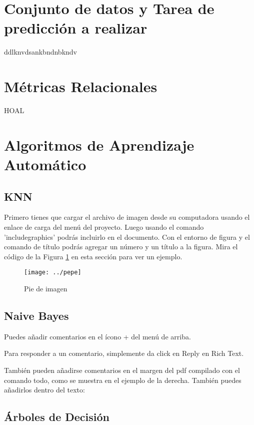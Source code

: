 \documentclass[12pt]{article}
\begin{document}
\section{Conjunto de datos y Tarea de predicción a realizar}
ddlknvdsankbndnbkndv

\section{Métricas Relacionales}
HOAL

\section{Algoritmos de Aprendizaje Automático}

\subsection{KNN}

Primero tienes que cargar el archivo de imagen desde su computadora usando el enlace de carga del menú del proyecto. Luego usando el comando 'includegraphics' podrás incluirlo en el documento. Con el entorno de figura y el comando de título podrás agregar un número y un título a la figura. Mira el código de la Figura \ref{fig:tesla} en esta sección para ver un ejemplo.


\begin{figure} %
    \centering
    \texttt{[image: ../pepe]}
    \caption{\label{fig:tesla}Pie de imagen}
\end{figure}


\subsection{Naive Bayes}
% 
% 
% 

Puedes añadir comentarios en el ícono + del menú de arriba.

Para responder a un comentario, simplemente da click en Reply en Rich Text.


También pueden añadirse comentarios en el margen del pdf compilado con el comando todo, como se muestra en el ejemplo de la derecha. También puedes añadirlos dentro del texto:

\subsection{Árboles de Decisión}
\end{document}
